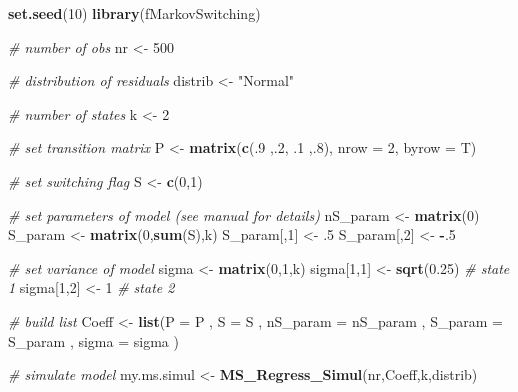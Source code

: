 \documentclass[11pt,]{book}
\newenvironment{Shaded}{\begin{snugshade}}{\end{snugshade}}
\newcommand{\KeywordTok}[1]{\textcolor[rgb]{0.27,0.27,0.27}{\textbf{#1}}}
\newcommand{\DataTypeTok}[1]{\textcolor[rgb]{0.27,0.27,0.27}{#1}}
\newcommand{\DecValTok}[1]{\textcolor[rgb]{0.06,0.06,0.06}{#1}}
\newcommand{\FloatTok}[1]{\textcolor[rgb]{0.06,0.06,0.06}{#1}}
\newcommand{\StringTok}[1]{\textcolor[rgb]{0.5,0.5,0.5}{#1}}
\newcommand{\CommentTok}[1]{\textcolor[rgb]{0.56,0.35,0.01}{\textit{#1}}}
\newcommand{\OperatorTok}[1]{\textcolor[rgb]{0.81,0.36,0.00}{\textbf{#1}}}
\newcommand{\NormalTok}[1]{#1}
\begin{document}
\begin{Shaded}
\begin{Highlighting}[]
\KeywordTok{set.seed}\NormalTok{(}\DecValTok{10}\NormalTok{)}
\KeywordTok{library}\NormalTok{(fMarkovSwitching)}

\CommentTok{# number of obs}
\NormalTok{nr <-}\StringTok{ }\DecValTok{500} 

\CommentTok{# distribution of residuals}
\NormalTok{distrib <-}\StringTok{ "Normal"} 

\CommentTok{# number of states}
\NormalTok{k <-}\StringTok{ }\DecValTok{2}  

\CommentTok{# set transition matrix}
\NormalTok{P <-}\StringTok{ }\KeywordTok{matrix}\NormalTok{(}\KeywordTok{c}\NormalTok{(.}\DecValTok{9}\NormalTok{ ,.}\DecValTok{2}\NormalTok{,}
\NormalTok{              .}\DecValTok{1}\NormalTok{ ,.}\DecValTok{8}\NormalTok{), }
            \DataTypeTok{nrow =} \DecValTok{2}\NormalTok{, }
            \DataTypeTok{byrow =}\NormalTok{ T)}

\CommentTok{# set switching flag           }
\NormalTok{S <-}\StringTok{ }\KeywordTok{c}\NormalTok{(}\DecValTok{0}\NormalTok{,}\DecValTok{1}\NormalTok{)}

\CommentTok{# set parameters of model (see manual for details)}
\NormalTok{nS_param <-}\StringTok{ }\KeywordTok{matrix}\NormalTok{(}\DecValTok{0}\NormalTok{)    }
\NormalTok{S_param <-}\StringTok{ }\KeywordTok{matrix}\NormalTok{(}\DecValTok{0}\NormalTok{,}\KeywordTok{sum}\NormalTok{(S),k)}
\NormalTok{S_param[,}\DecValTok{1}\NormalTok{] <-}\StringTok{  }\NormalTok{.}\DecValTok{5}         
\NormalTok{S_param[,}\DecValTok{2}\NormalTok{] <-}\StringTok{ }\OperatorTok{-}\NormalTok{.}\DecValTok{5}

\CommentTok{# set variance of model}
\NormalTok{sigma <-}\StringTok{ }\KeywordTok{matrix}\NormalTok{(}\DecValTok{0}\NormalTok{,}\DecValTok{1}\NormalTok{,k)}
\NormalTok{sigma[}\DecValTok{1}\NormalTok{,}\DecValTok{1}\NormalTok{] <-}\StringTok{ }\KeywordTok{sqrt}\NormalTok{(}\FloatTok{0.25}\NormalTok{)  }\CommentTok{# state 1}
\NormalTok{sigma[}\DecValTok{1}\NormalTok{,}\DecValTok{2}\NormalTok{] <-}\StringTok{ }\DecValTok{1}           \CommentTok{# state 2}

\CommentTok{# build list}
\NormalTok{Coeff <-}\StringTok{ }\KeywordTok{list}\NormalTok{(}\DataTypeTok{P =}\NormalTok{ P               ,}
              \DataTypeTok{S =}\NormalTok{ S               ,}
              \DataTypeTok{nS_param =}\NormalTok{ nS_param ,}
              \DataTypeTok{S_param =}\NormalTok{ S_param   ,}
              \DataTypeTok{sigma =}\NormalTok{ sigma       )}

\CommentTok{# simulate model}
\NormalTok{my.ms.simul <-}\StringTok{ }\KeywordTok{MS_Regress_Simul}\NormalTok{(nr,Coeff,k,distrib)}
\end{Highlighting}
\end{Shaded}
\end{document}
